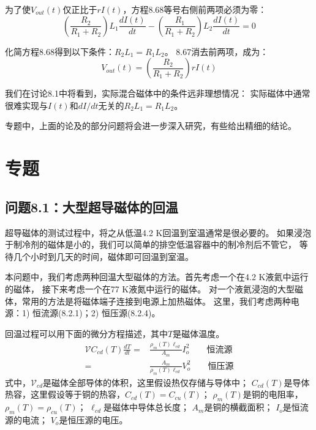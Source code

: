 为了使$V_{out}(t)$仅正比于$rI(t)$，方程8.68等号右侧前两项必须为零：
\begin{equation}%
\left(\frac{R_2}{R_1+R_2}\right)L_1\frac{dI(t)}{dt}-\left(\frac{R_1}{R_1+R_2}\right)L_2\frac{dI(t)}{dt}=0
\end{equation}

化简方程8.68得到以下条件：$R_2L_1=R_1L_2$。
8.67消去前两项，成为：
\begin{equation}%
V_{out}(t)=\left(\frac{R_2}{R_1+R_2}\right)rI(t)
\end{equation}

我们在讨论8.1中将看到，实际混合磁体中的条件远非理想情况：
实际磁体中通常很难实现与$I(t)$和$dI/dt$无关的$R_2L_1=R_1L_2$。

专题中，上面的论及的部分问题将会进一步深入研究，有些给出精细的结论。

\section{专题}

\subsection{问题8.1：大型超导磁体的回温}
超导磁体的测试过程中，将之从低温4.2 K回温到室温通常是很必要的。
如果浸泡于制冷剂的磁体是小的，我们可以简单的排空低温容器中的制冷剂后不管它，
等待几个小时到几天的时间，磁体即可回温到室温。

本问题中，我们考虑两种回温大型磁体的方法。首先考虑一个在4.2 K液氦中运行的磁体，
接下来考虑一个在77 K液氮中运行的磁体。
对一个液氦浸泡的大型磁体，常用的方法是将磁体端子连接到电源上加热磁体。
这里，我们考虑两种电源：1) 恒流源(8.2.1)；2) 恒压源(8.2.4)。

回温过程可以用下面的微分方程描述，其中$T$是磁体温度。
\begin{subequations}
	\begin{align}
\mathcal{V}C_{cd}(T)\frac{dT}{dt}=&\frac{\rho_m(T)\ell_{cd}}{A_m}I_{o}^{2} \qquad \mbox{恒流源}\\
=&\frac{A_m}{\rho_m(T)\ell_{cd}}V_{o}^{2} \qquad \mbox{恒压源}
	\end{align}
\end{subequations}
式中，$\mathcal{V}_{cd}$是磁体全部导体的体积，这里假设热仅存储与导体中；
$C_{cd}(T)$是导体热容，这里假设等于铜的热容，$C_{cd}(T)=C_{cu}(T)$；
$\rho_m(T)$是铜的电阻率，$\rho_m(T)=\rho_{cu}(T)$；
$\ell_{cd}$是磁体中导体总长度；
$A_m$是铜的横截面积；
$I_o$是恒流源的电流；
$V_o$是恒压源的电压。

